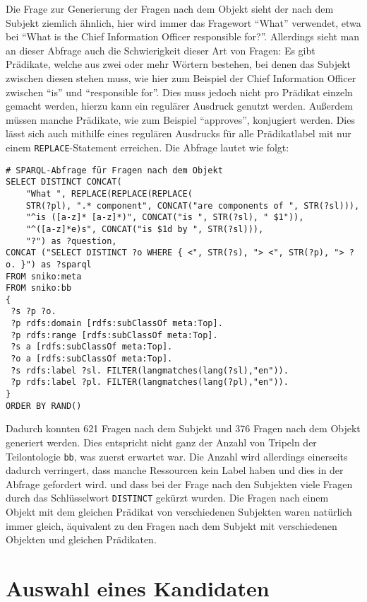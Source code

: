 Die Frage zur Generierung der Fragen nach dem Objekt sieht der nach dem Subjekt ziemlich ähnlich, hier wird immer das Fragewort \enquote{What} verwendet, etwa bei \enquote{What is the Chief Information Officer responsible for?}.
Allerdings sieht man an dieser Abfrage auch die Schwierigkeit dieser Art von Fragen:
Es gibt Prädikate, welche aus zwei oder mehr Wörtern bestehen, bei denen das Subjekt zwischen diesen stehen muss, wie hier zum Beispiel der Chief Information Officer zwischen \enquote{is} und \enquote{responsible for}.
Dies muss jedoch nicht pro Prädikat einzeln gemacht werden, hierzu kann ein regulärer Ausdruck genutzt werden.
Außerdem müssen manche Prädikate, wie zum Beispiel \enquote{approves}, konjugiert werden.
Dies lässt sich auch mithilfe eines regulären Ausdrucks für alle Prädikatlabel mit nur einem \texttt{REPLACE}-Statement erreichen.
Die Abfrage lautet wie folgt:
\begin{lstlisting}[language=SPARQL]
# SPARQL-Abfrage für Fragen nach dem Objekt
SELECT DISTINCT CONCAT(
    "What ", REPLACE(REPLACE(REPLACE(
    STR(?pl), ".* component", CONCAT("are components of ", STR(?sl))),
    "^is ([a-z]* [a-z]*)", CONCAT("is ", STR(?sl), " $1")),
    "^([a-z]*e)s", CONCAT("is $1d by ", STR(?sl))),
    "?") as ?question,
CONCAT ("SELECT DISTINCT ?o WHERE { <", STR(?s), "> <", STR(?p), "> ?o. }") as ?sparql
FROM sniko:meta
FROM sniko:bb
{
 ?s ?p ?o.
 ?p rdfs:domain [rdfs:subClassOf meta:Top].
 ?p rdfs:range [rdfs:subClassOf meta:Top].
 ?s a [rdfs:subClassOf meta:Top].
 ?o a [rdfs:subClassOf meta:Top].
 ?s rdfs:label ?sl. FILTER(langmatches(lang(?sl),"en")).
 ?p rdfs:label ?pl. FILTER(langmatches(lang(?pl),"en")).
}
ORDER BY RAND()
\end{lstlisting}

Dadurch konnten 621 Fragen nach dem Subjekt und 376 Fragen nach dem Objekt generiert werden.
Dies entspricht nicht ganz der Anzahl von Tripeln der Teilontologie \texttt{bb}, was zuerst erwartet war.
Die Anzahl wird allerdings einerseits dadurch verringert, dass manche Ressourcen kein Label haben und dies in der Abfrage gefordert wird.
und dass bei der Frage nach den Subjekten viele Fragen durch das Schlüsselwort \texttt{DISTINCT} gekürzt wurden.
Die Fragen nach einem Objekt mit dem gleichen Prädikat von verschiedenen Subjekten waren natürlich immer gleich,
äquivalent zu den Fragen nach dem Subjekt mit verschiedenen Objekten und gleichen Prädikaten.

\section{Auswahl eines Kandidaten}

